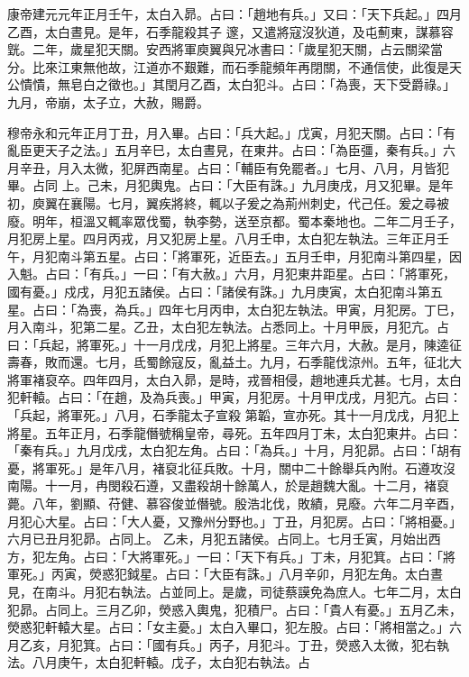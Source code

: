 \begin{pinyinscope}
 康帝建元元年正月壬午，太白入昴。占曰：「趙地有兵。」又曰：「天下兵起。」四月乙酉，太白晝見。是年，石季龍殺其子
 邃，又遣將寇沒狄道，及屯薊東，謀慕容皝。二年，歲星犯天關。安西將軍庾翼與兄冰書曰：「歲星犯天關，占云關梁當分。比來江東無他故，江道亦不艱難，而石季龍頻年再閉關，不通信使，此復是天公憒憒，無皂白之徵也。」其閏月乙酉，太白犯斗。占曰：「為喪，天下受爵祿。」九月，帝崩，太子立，大赦，賜爵。



 穆帝永和元年正月丁丑，月入畢。占曰：「兵大起。」戊寅，月犯天關。占曰：「有亂臣更天子之法。」五月辛巳，太白晝見，在東井。占曰：「為臣彊，秦有兵。」六月辛丑，月入太微，犯屏西南星。占曰：「輔臣有免罷者。」七月、八月，月皆犯畢。占同
 上。己未，月犯輿鬼。占曰：「大臣有誅。」九月庚戌，月又犯畢。是年初，庾翼在襄陽。七月，翼疾將終，輒以子爰之為荊州刺史，代己任。爰之尋被廢。明年，桓溫又輒率眾伐蜀，執李勢，送至京都。蜀本秦地也。二年二月壬子，月犯房上星。四月丙戎，月又犯房上星。八月壬申，太白犯左執法。三年正月壬午，月犯南斗第五星。占曰：「將軍死，近臣去。」五月壬申，月犯南斗第四星，因入魁。占曰：「有兵。」一曰：「有大赦。」六月，月犯東井距星。占曰：「將軍死，國有憂。」戍戌，月犯五諸侯。占曰：「諸侯有誅。」九月庚寅，太白犯南斗第五
 星。占曰：「為喪，為兵。」四年七月丙申，太白犯左執法。甲寅，月犯房。丁巳，月入南斗，犯第二星。乙丑，太白犯左執法。占悉同上。十月甲辰，月犯亢。占曰：「兵起，將軍死。」十一月戊戌，月犯上將星。三年六月，大赦。是月，陳逵征壽春，敗而還。七月，氐蜀餘寇反，亂益土。九月，石季龍伐涼州。五年，征北大將軍褚裒卒。四年四月，太白入昴，是時，戎晉相侵，趙地連兵尤甚。七月，太白犯軒轅。占曰：「在趙，及為兵喪。」甲寅，月犯房。十月甲戊戌，月犯亢。占曰：「兵起，將軍死。」八月，石季龍太子宣殺
 第韜，宣亦死。其十一月戊戌，月犯上將星。五年正月，石季龍僭號稱皇帝，尋死。五年四月丁未，太白犯東井。占曰：「秦有兵。」九月戊戌，太白犯左角。占曰：「為兵。」十月，月犯昴。占曰：「胡有憂，將軍死。」是年八月，褚裒北征兵敗。十月，關中二十餘舉兵內附。石遵攻沒南陽。十一月，冉閔殺石遵，又盡殺胡十餘萬人，於是趙魏大亂。十二月，褚裒薨。八年，劉顯、苻健、慕容俊並僭號。殷浩北伐，敗績，見廢。六年二月辛酉，月犯心大星。占曰：「大人憂，又豫州分野也。」丁丑，月犯房。占曰：「將相憂。」六月已丑月犯昴。占同上。
 乙未，月犯五諸侯。占同上。七月壬寅，月始出西方，犯左角。占曰：「大將軍死。」一曰：「天下有兵。」丁未，月犯箕。占曰：「將軍死。」丙寅，熒惑犯鉞星。占曰：「大臣有誅。」八月辛卯，月犯左角。太白晝見，在南斗。月犯右執法。占並同上。是歲，司徒蔡謨免為庶人。七年二月，太白犯昴。占同上。三月乙卯，熒惑入輿鬼，犯積尸。占曰：「貴人有憂。」五月乙未，熒惑犯軒轅大星。占曰：「女主憂。」太白入畢口，犯左股。占曰：「將相當之。」六月乙亥，月犯箕。占曰：「國有兵。」丙子，月犯斗。丁丑，熒惑入太微，犯右執法。八月庚午，太白犯軒轅。戊子，太白犯右執法。占

\end{pinyinscope}
